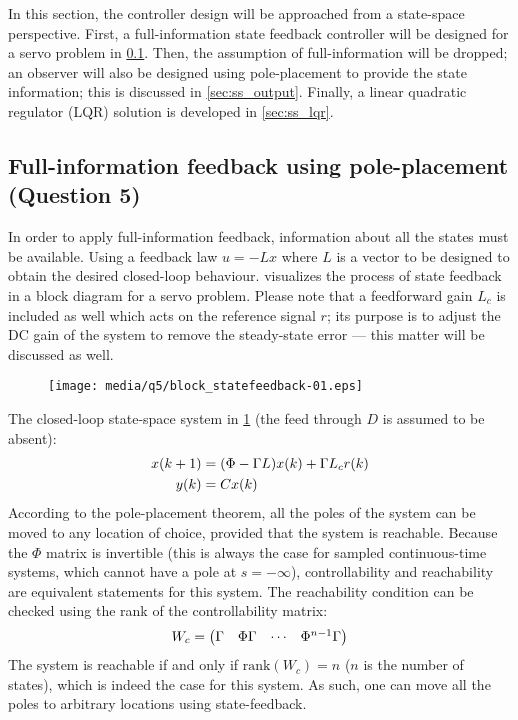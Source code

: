 In this section, the controller design will be approached from a state-space perspective. First, a full-information state feedback controller will be designed for a servo problem in \cref{sec:ss_full}. Then, the assumption of full-information will be dropped; an observer will also be designed using pole-placement to provide the state information; this is discussed in \cref{sec:ss_output}. Finally, a linear quadratic regulator (LQR) solution is developed in \cref{sec:ss_lqr}.

\subsection{Full-information feedback using pole-placement \textnormal{\phantom{xxx}(Question 5)}}
\label{sec:ss_full}
In order to apply full-information feedback, information about all the states must be available. Using a feedback law $u = -Lx$ where $L$ is a vector to be designed to obtain the desired closed-loop behaviour.  visualizes the process of state feedback in a block diagram for a servo problem. Please note that a feedforward gain $L_c$ is included as well which acts on the reference signal $r$; its purpose is to adjust the DC gain of the system to remove the steady-state error --- this matter will be discussed as well.
\begin{figure}[ht]
    \centering
    \texttt{[image: media/q5/block\_statefeedback-01.eps]}
    \caption{}
    \label{fig:q5_block_statefeedback}
\end{figure}
The closed-loop state-space system in \cref{fig:q5_block_statefeedback}  (the feed through $D$ is assumed to be absent):
\begin{equation}
    \begin{aligned}
        x(k+1) &= \qty(\Phi - \Gamma L)x(k) + \Gamma L_c r(k)\\
        y(k) &= Cx(k)\\
    \end{aligned}
\end{equation}
According to the pole-placement theorem, all the poles of the system can be moved to any location of choice, provided that the system is reachable. Because the $\Phi$ matrix is invertible (this is always the case for sampled continuous-time systems, which cannot have a pole at $s = -\infty$), controllability and reachability are equivalent statements for this system. The reachability condition can be checked using the rank of the controllability matrix:
$$ W_c = \mqty(\Gamma & \Phi \Gamma & \cdots & \Phi^{n-1}\Gamma)$$
The system is reachable if and only if $\mathrm{rank}(W_c) = n$ ($n$ is the number of states), which is indeed the case for this system. As such, one can move all the poles to arbitrary locations using state-feedback.

